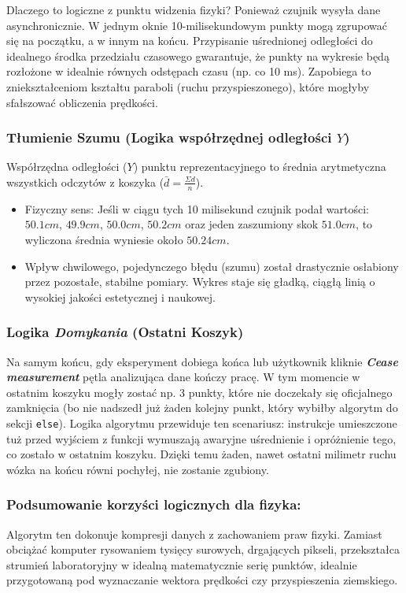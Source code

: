 \documentclass[a4paper,12pt]{article}
\begin{document}
\noindent Dlaczego to logiczne z punktu widzenia fizyki? Ponieważ czujnik wysyła dane asynchronicznie. W jednym oknie 10-milisekundowym punkty mogą zgrupować się na początku, a w innym na końcu. Przypisanie uśrednionej odległości do idealnego środka przedziału czasowego gwarantuje, że punkty na wykresie będą rozłożone w idealnie równych odstępach czasu (np. co 10 ms). Zapobiega to zniekształceniom kształtu paraboli (ruchu przyspieszonego), które mogłyby sfałszować obliczenia prędkości.

\subsubsection*{Tłumienie Szumu (Logika współrzędnej odległości \texorpdfstring{$Y$}{Y})}
Współrzędna odległości ($Y$) punktu reprezentacyjnego to średnia arytmetyczna wszystkich odczytów z koszyka ($\bar{d} = \frac{\Sigma d}{n}$).

\begin{itemize}
    \item Fizyczny sens: Jeśli w ciągu tych 10 milisekund czujnik podał wartości: $50.1{ cm}$, $49.9{ cm}$, $50.0{ cm}$, $50.2{ cm}$ oraz jeden zaszumiony skok $51.0{ cm}$, to wyliczona średnia wyniesie około $50.24{ cm}$.
    \item Wpływ chwilowego, pojedynczego błędu (szumu) został drastycznie osłabiony przez pozostałe, stabilne pomiary. Wykres staje się gładką, ciągłą linią o wysokiej jakości estetycznej i naukowej.
\end{itemize}

\subsubsection*{Logika \textit{Domykania} (Ostatni Koszyk)}
Na samym końcu, gdy eksperyment dobiega końca lub użytkownik kliknie \textbf{\textit{Cease measurement}} pętla analizująca dane kończy pracę.
W tym momencie w ostatnim koszyku mogły zostać np. 3 punkty, które nie doczekały się oficjalnego zamknięcia (bo nie nadszedł już żaden kolejny punkt, który wybiłby algorytm do sekcji \texttt{else}).
Logika algorytmu przewiduje ten scenariusz: instrukcje umieszczone tuż przed wyjściem z funkcji wymuszają awaryjne uśrednienie i opróżnienie tego, co zostało w ostatnim koszyku. Dzięki temu żaden, nawet ostatni milimetr ruchu wózka na końcu równi pochyłej, nie zostanie zgubiony.

\subsubsection*{Podsumowanie korzyści logicznych dla fizyka:}
Algorytm ten dokonuje kompresji danych z zachowaniem praw fizyki. Zamiast obciążać komputer rysowaniem tysięcy surowych, drgających pikseli, przekształca strumień laboratoryjny w idealną matematycznie serię punktów, idealnie przygotowaną pod wyznaczanie wektora prędkości czy przyspieszenia ziemskiego.
\end{document}
